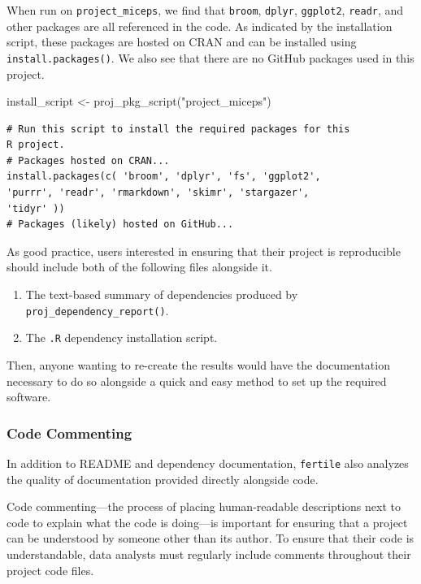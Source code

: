 \documentclass[12pt,twoside]{reedthesis}
\newenvironment{Shaded}{\begin{snugshade}}{\end{snugshade}}
\newcommand{\FunctionTok}[1]{\textcolor[rgb]{0.00,0.00,0.00}{#1}}
\newcommand{\NormalTok}[1]{#1}
\newcommand{\OtherTok}[1]{\textcolor[rgb]{0.56,0.35,0.01}{#1}}
\newcommand{\StringTok}[1]{\textcolor[rgb]{0.31,0.60,0.02}{#1}}
\providecommand{\tightlist}{%
  \setlength{\itemsep}{0pt}\setlength{\parskip}{0pt}}
\begin{document}
When run on \texttt{project\_miceps}, we find that \texttt{broom}, \texttt{dplyr}, \texttt{ggplot2}, \texttt{readr}, and other packages are all referenced in the code. As indicated by the installation script, these packages are hosted on CRAN and can be installed using \texttt{install.packages()}. We also see that there are no GitHub packages used in this project.
\begin{Shaded}
\begin{Highlighting}[]
\NormalTok{install\_script }\OtherTok{\textless{}{-}} \FunctionTok{proj\_pkg\_script}\NormalTok{(}\StringTok{"project\_miceps"}\NormalTok{)}
\end{Highlighting}
\end{Shaded}
\begin{verbatim}
# Run this script to install the required packages for this
R project.
# Packages hosted on CRAN...
install.packages(c( 'broom', 'dplyr', 'fs', 'ggplot2',
'purrr', 'readr', 'rmarkdown', 'skimr', 'stargazer',
'tidyr' ))
# Packages (likely) hosted on GitHub...
\end{verbatim}
As good practice, users interested in ensuring that their project is reproducible should include both of the following files alongside it.
\begin{enumerate}
\def\labelenumi{\arabic{enumi}.}
\tightlist
\item
  The text-based summary of dependencies produced by \texttt{proj\_dependency\_report()}.
\item
  The \texttt{.R} dependency installation script.
\end{enumerate}
Then, anyone wanting to re-create the results would have the documentation necessary to do so alongside a quick and easy method to set up the required software.

\hypertarget{code-commenting}{%
\subsubsection{Code Commenting}\label{code-commenting}}

In addition to README and dependency documentation, \texttt{fertile} also analyzes the quality of documentation provided directly alongside code.

Code commenting---the process of placing human-readable descriptions next to code to explain what the code is doing---is important for ensuring that a project can be understood by someone other than its author. To ensure that their code is understandable, data analysts must regularly include comments throughout their project code files.
\end{document}
